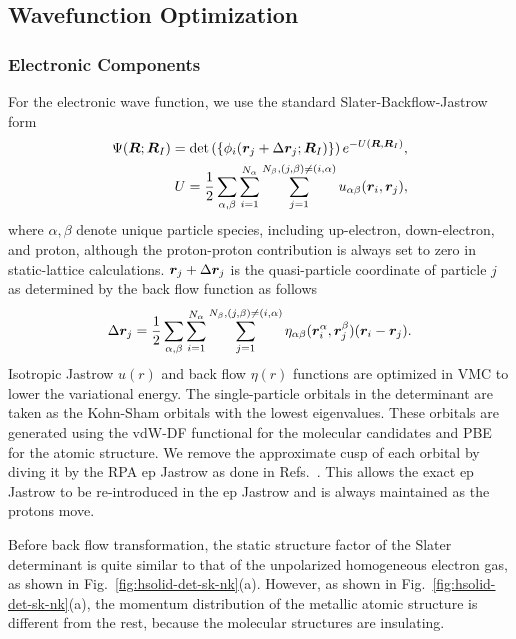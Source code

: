 \subsection{Wavefunction Optimization}

\subsubsection{Electronic Components}
For the electronic wave function, we use the standard Slater-Backflow-Jastrow form
\begin{align}
\Psi(\boldsymbol{R};\boldsymbol{R}_I) = \det\left( \{ \phi_i(\boldsymbol{r}_j+\Delta\boldsymbol{r}_j;\boldsymbol{R}_I)\} \right) e^{-U(\boldsymbol{R},\boldsymbol{R}_I)}, \\
U = \frac{1}{2}\sum\limits_{\alpha, \beta} \sum\limits_{i=1}^{N_\alpha} \sum\limits_{j=1}^{N_\beta, (j,\beta)\neq(i,\alpha)} u_{\alpha\beta}(\boldsymbol{r}_i, \boldsymbol{r}_j), \label{eq:hsolid-ujas}
\end{align}
where $\alpha, \beta$ denote unique particle species, including up-electron, down-electron, and proton, although the proton-proton contribution is always set to zero in static-lattice calculations. $\boldsymbol{r}_j+\Delta\boldsymbol{r}_j$ is the quasi-particle coordinate of particle $j$ as determined by the back flow function as follows
\begin{align}
\Delta \boldsymbol{r}_j = \frac{1}{2}\sum\limits_{\alpha, \beta} \sum\limits_{i=1}^{N_\alpha} \sum\limits_{j=1}^{N_\beta, (j,\beta)\neq(i,\alpha)} \eta_{\alpha\beta}(\boldsymbol{r}_i^\alpha, \boldsymbol{r}_j^\beta)(\boldsymbol{r}_i-\boldsymbol{r}_j).
\label{eq:hsolid-bf}
\end{align}
Isotropic Jastrow $u(r)$ and back flow $\eta(r)$ functions are optimized in VMC to lower the variational energy.
The single-particle orbitals in the determinant are taken as the Kohn-Sham orbitals with the lowest eigenvalues.
These orbitals are generated using the vdW-DF functional for the molecular candidates and PBE for the atomic structure. We remove the approximate cusp of each orbital by diving it by the RPA ep Jastrow as done in Refs.~\cite{Ceperley1987,Natoli1993,Natoli1995}.
This allows the exact ep Jastrow to be re-introduced in the ep Jastrow and is always maintained as the protons move.

Before back flow transformation, the static structure factor of the Slater determinant is quite similar to that of the unpolarized homogeneous electron gas, as shown in Fig.~\ref{fig:hsolid-det-sk-nk}(a). However, as shown in  Fig.~\ref{fig:hsolid-det-sk-nk}(a), the momentum distribution of the metallic atomic structure is different from the rest, because the molecular structures are insulating.


